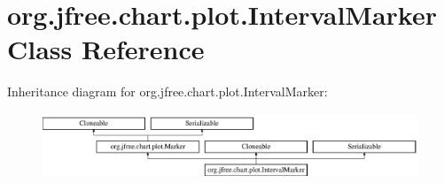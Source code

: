 \hypertarget{classorg_1_1jfree_1_1chart_1_1plot_1_1_interval_marker}{}\section{org.\+jfree.\+chart.\+plot.\+Interval\+Marker Class Reference}
\label{classorg_1_1jfree_1_1chart_1_1plot_1_1_interval_marker}
Inheritance diagram for org.\+jfree.\+chart.\+plot.\+Interval\+Marker\+:\begin{figure}[H]
\begin{center}
\leavevmode
\includegraphics[height=1.971831cm]{classorg_1_1jfree_1_1chart_1_1plot_1_1_interval_marker}
\end{center}
\end{figure}
